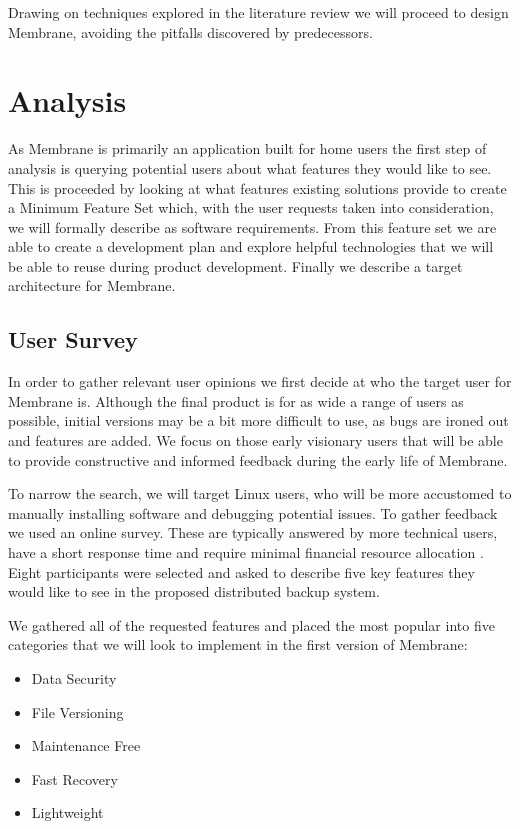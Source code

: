 \documentclass[11pt, a4paper, twocolumn, twoside]{report}
\begin{document}
Drawing on techniques explored in the literature review we will proceed to design Membrane, avoiding the pitfalls discovered by predecessors.

\chapter{Analysis}

As Membrane is primarily an application built for home users the first step of analysis is querying potential users about what features they would like to see. This is proceeded by looking at what features existing solutions provide to create a Minimum Feature Set which, with the user requests taken into consideration, we will formally describe as software requirements. From this feature set we are able to create a development plan and explore helpful technologies that we will be able to reuse during product development. Finally we describe a target architecture for Membrane.

\section{User Survey}

In order to gather relevant user opinions we first decide at who the target user for Membrane is. Although the final product is for as wide a range of users as possible, initial versions may be a bit more difficult to use, as bugs are ironed out and features are added. We focus on those early visionary users that will be able to provide constructive and informed feedback during the early life of Membrane.

To narrow the search, we will target Linux users, who will be more accustomed to manually installing software and debugging potential issues. To gather feedback we used an online survey. These are typically answered by more technical users, have a short response time and require minimal financial resource allocation \citep{ilieva2002online}. Eight participants were selected and asked to describe five key features they would like to see in the proposed distributed backup system.

We gathered all of the requested features and placed the most popular into five categories that we will look to implement in the first version of Membrane:

\begin{itemize}
 \item Data Security
 \item File Versioning
 \item Maintenance Free
 \item Fast Recovery
 \item Lightweight
\end{itemize}
\end{document}
